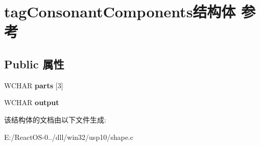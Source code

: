 \hypertarget{structtag_consonant_components}{}\section{tag\+Consonant\+Components结构体 参考}
\label{structtag_consonant_components}
\subsection*{Public 属性}
\begin{DoxyCompactItemize}
\item 
\mbox{\label{structtag_consonant_components_ae3755c4f166b0db74261dcb3478e1d9b}} 
W\+C\+H\+AR {\bfseries parts} \mbox{[}3\mbox{]}
\item 
\mbox{\label{structtag_consonant_components_aeb54801e4677ed70af052fb825e85136}} 
W\+C\+H\+AR {\bfseries output}
\end{DoxyCompactItemize}


该结构体的文档由以下文件生成\+:\begin{DoxyCompactItemize}
\item 
E\+:/\+React\+O\+S-\/0../dll/win32/usp10/shape.\+c\end{DoxyCompactItemize}
